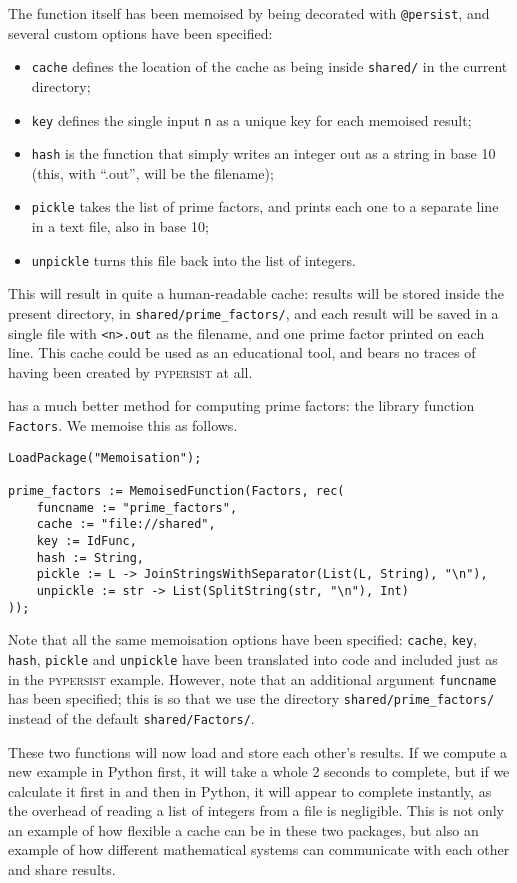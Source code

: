 \documentclass{deliverablereport}
\newcommand{\pypersist}{\textsc{pypersist}}
\begin{document}
The function itself has been memoised by being decorated with \texttt{@persist},
and several custom options have been specified:
\begin{itemize}
\item \texttt{cache} defines the location of the cache as being inside
  \texttt{shared/} in the current directory;
\item \texttt{key} defines the single input \texttt{n} as a unique key for each
  memoised result;
\item \texttt{hash} is the function that simply writes an integer out as a
  string in base 10 (this, with ``.out'', will be the filename);
\item \texttt{pickle} takes the list of prime factors, and prints each one to a
  separate line in a text file, also in base 10;
\item \texttt{unpickle} turns this file back into the list of integers.
\end{itemize}
This will result in quite a human-readable cache: results will be stored inside
the present directory, in \texttt{shared/prime\_factors/}, and each result will
be saved in a single file with \texttt{<n>.out} as the filename, and one prime
factor printed on each line.  This cache could be used as an educational tool,
and bears no traces of having been created by \pypersist{} at all.

\GAP has a much better method for computing prime factors: the library function
\texttt{Factors}.  We memoise this as follows.

{\tiny
\begin{verbatim}
LoadPackage("Memoisation");

prime_factors := MemoisedFunction(Factors, rec(
    funcname := "prime_factors",
    cache := "file://shared",
    key := IdFunc,
    hash := String,
    pickle := L -> JoinStringsWithSeparator(List(L, String), "\n"),
    unpickle := str -> List(SplitString(str, "\n"), Int)
));
\end{verbatim}
}

Note that all the same memoisation options have been specified: \texttt{cache},
\texttt{key}, \texttt{hash}, \texttt{pickle} and \texttt{unpickle} have been
translated into \GAP code and included just as in the \pypersist{} example.
However, note that an additional argument \texttt{funcname} has been specified;
this is so that we use the directory \texttt{shared/prime\_factors/} instead of
the default \texttt{shared/Factors/}.

These two functions will now load and store each other's results.  If we compute
a new example in Python first, it will take a whole 2 seconds to complete, but
if we calculate it first in \GAP and then in Python, it will appear to complete
instantly, as the overhead of reading a list of integers from a file is
negligible.  This is not only an example of how flexible a cache can be in these
two packages, but also an example of how different mathematical systems can
communicate with each other and share results.
\end{document}
